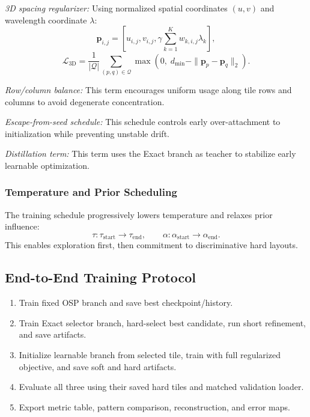\documentclass[journal]{IEEEtran}
\begin{document}
\textit{3D spacing regularizer:} Using normalized spatial coordinates $(u,v)$ and wavelength coordinate $\lambda$:
\begin{equation}
\mathbf{p}_{i,j}=
\left[
 u_{i,j},
 v_{i,j},
 \gamma\sum_{k=1}^{K}w_{k,i,j}\lambda_k
\right],
\end{equation}
\begin{equation}
\mathcal{L}_{\mathrm{3D}}
=
\frac{1}{|\mathcal{Q}|}
\sum_{(p,q)\in\mathcal{Q}}
\max(0,\;d_{\min}-\|\mathbf{p}_p-\mathbf{p}_q\|_2).
\end{equation}

\textit{Row/column balance:} This term encourages uniform usage along tile rows and columns to avoid degenerate concentration.

\textit{Escape-from-seed schedule:} This schedule controls early over-attachment to initialization while preventing unstable drift.

\textit{Distillation term:} This term uses the Exact branch as teacher to stabilize early learnable optimization.

\subsubsection{Temperature and Prior Scheduling}
The training schedule progressively lowers temperature and relaxes prior influence:
\begin{equation}
\tau: \tau_{\mathrm{start}}\rightarrow \tau_{\mathrm{end}},
\qquad
\alpha: \alpha_{\mathrm{start}}\rightarrow \alpha_{\mathrm{end}}.
\end{equation}
This enables exploration first, then commitment to discriminative hard layouts.

\subsection{End-to-End Training Protocol}
\begin{enumerate}
\item Train fixed OSP branch and save best checkpoint/history.
\item Train Exact selector branch, hard-select best candidate, run short refinement, and save artifacts.
\item Initialize learnable branch from selected tile, train with full regularized objective, and save soft and hard artifacts.
\item Evaluate all three using their saved hard tiles and matched validation loader.
\item Export metric table, pattern comparison, reconstruction, and error maps.
\end{enumerate}
\end{document}
